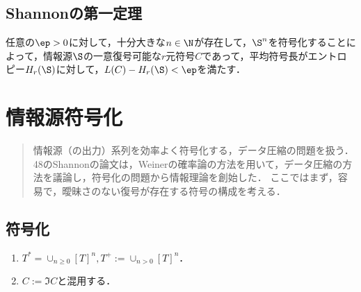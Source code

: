 \documentclass[uplatex,dvipdfmx]{jsreport}
\begin{document}
\section{Shannonの第一定理}

\begin{theorem}
    任意の$\ep>0$に対して，十分大きな$n\in\N$が存在して，$\S^n$を符号化することによって，情報源$\S$の一意復号可能な$r$元符号$C$であって，平均符号長がエントロピー$H_r(\S)$に対して，$L(C)-H_r(\S)<\ep$を満たす．
\end{theorem}

\chapter{情報源符号化}

\begin{quotation}
    情報源（の出力）系列を効率よく符号化する，データ圧縮の問題を扱う．
    48のShannonの論文は，Weinerの確率論の方法を用いて，データ圧縮の方法を議論し，符号化の問題から情報理論を創始した．
    ここではまず，容易で，曖昧さのない復号が存在する符号の構成を考える．
\end{quotation}

\section{符号化}

\begin{notation}\mbox{}
    \begin{enumerate}
        \item $T^*=\cup_{n\ge0}[T]^n,T^+:=\cup_{n>0}[T]^n$．
        \item $C:=\Im C$と混用する．
    \end{enumerate}
\end{notation}
\end{document}
